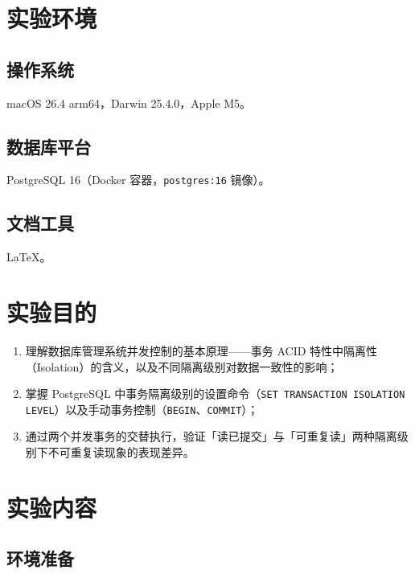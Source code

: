 \documentclass[12pt, a4paper]{academics}
\begin{document}
\def\PYGZus{\textunderscore}

\makeacademicscover

\section{实验环境}

\subsection{操作系统}

macOS 26.4 arm64，Darwin 25.4.0，Apple M5。

\subsection{数据库平台}

PostgreSQL 16（Docker 容器，\texttt{postgres:16} 镜像）。

\subsection{文档工具}

\LaTeX{}。

\section{实验目的}

\begin{enumerate}
    \item 理解数据库管理系统并发控制的基本原理——事务 ACID 特性中隔离性（Isolation）的含义，以及不同隔离级别对数据一致性的影响；
    \item 掌握 PostgreSQL 中事务隔离级别的设置命令（\texttt{SET TRANSACTION ISOLATION LEVEL}）以及手动事务控制（\texttt{BEGIN}、\texttt{COMMIT}）；
    \item 通过两个并发事务的交替执行，验证「读已提交」与「可重复读」两种隔离级别下不可重复读现象的表现差异。
\end{enumerate}

\section{实验内容}

\subsection{环境准备}
\end{document}
